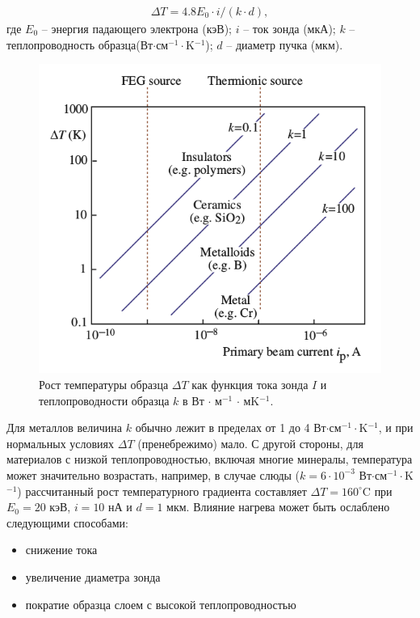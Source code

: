 \documentclass[12pt]{article}
\newcommand{\lb}{\left(}
\newcommand{\rb}{\right)}
\begin{document}
\begin{gather}
		\Delta T = 4.8 E_0 \cdot i / \lb k \cdot d \rb, 
\end{gather}
где $E_0$ -- энергия падающего электрона (кэВ); $i$ -- ток зонда (мкА); $k$ -- теплопроводность образца(Вт$\cdot$см$^{-1}\cdot$K$^{-1}$); $d$ -- диаметр пучка (мкм). 

\begin{figure}[!ht]
\centering
\includegraphics[scale = 0.7]{pictures/delta_t.png}
\caption{Рост температуры образца $\Delta T$ как функция тока зонда $I$ и теплопроводности образца $k$ в Вт $\cdot$ м$^{-1}$ $\cdot$ мK$^{-1}$.}
\label{tungsten-cathode}
\end{figure}

Для металлов величина $k$ обычно лежит в пределах от 1 до 4 Вт$\cdot$см$^{-1}\cdot$K$^{-1}$, и при нормальных условиях $\Delta T$ (пренебрежимо) мало. С другой стороны, для материалов с низкой теплопроводностью, включая многие минералы, температура может значительно возрастать, например, в случае слюды ($k = 6 \cdot 10^{-3}$ Вт$\cdot$см$^{-1}\cdot$K$^{-1}$) рассчитанный рост температурного градиента составляет $\Delta T = 160^\circ$C при $E_0 = 20$ кэВ, $i = 10$ нА и $d = 1$ мкм. Влияние нагрева может быть ослаблено следующими способами:
\begin{itemize}
		\item снижение тока 
		\item увеличение диаметра зонда 
		\item пократие образца слоем с высокой теплопроводностью
\end{itemize}
\end{document}
